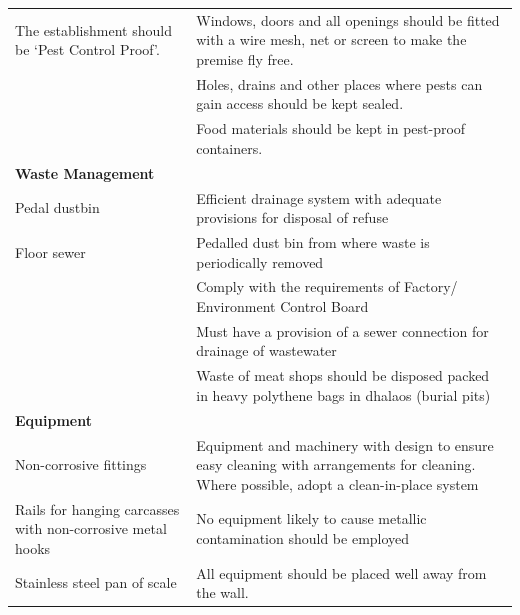 \documentclass[a4paper, 12pt, twoside]{article}
\newcommand\tabitem{\makebox[1em][r]{\textbullet~}}
\begin{document}
\begin{longtable}[l]{>{\raggedright}p{6.5cm}>{\raggedright\arraybackslash}p{8.5cm}}
	\newline{}\tabitem The establishment should be ‘Pest Control Proof’. 	&	\newline{} \tabitem Windows, doors and all openings should be fitted with a wire mesh, net or screen to make the premise fly free.\\
	&	\newline{}\tabitem Holes, drains and other places where pests can gain access should be kept sealed.\\
	&	\newline{}\tabitem Food materials should be kept in pest-proof containers. \\
    \midrule
   \textbf{Waste Management} 	&	\\
    \midrule
    \tabitem Pedal dustbin	& 	\tabitem Efficient drainage system with adequate provisions for disposal of refuse\\
	\newline{} \tabitem Floor sewer & \newline{} \tabitem Pedalled dust bin from where waste is periodically removed\\\newline{}
	&	\newline{} \tabitem Comply with the requirements of Factory/ Environment Control Board \\
	&	\newline{} \tabitem Must have a provision of a sewer connection for drainage of wastewater\\
	&	\newline{} \tabitem Waste of meat shops should be disposed packed in heavy polythene bags in dhalaos (burial pits) \\
\midrule
  \textbf{Equipment}	&  \\
    \midrule
    \tabitem Non-corrosive fittings & \tabitem Equipment and machinery with design to ensure easy cleaning with arrangements for cleaning. Where possible, adopt a clean-in-place system\\
	\newline{} \tabitem Rails for hanging carcasses with non-corrosive metal hooks 	&	\newline{} \tabitem No equipment likely to cause metallic contamination should be employed\\
	\newline{} \tabitem Stainless steel pan of scale	&	\newline{} \tabitem All equipment should be placed well away from the wall.\\

\end{longtable}
\end{document}
